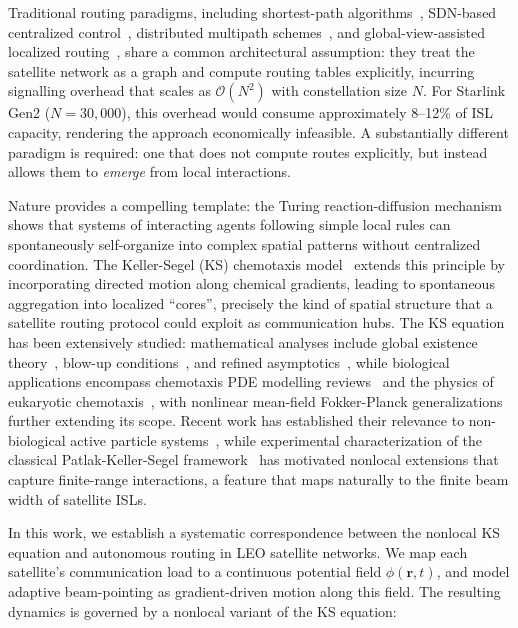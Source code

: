 \documentclass[sn-nature,pdflatex]{sn-jnl}
\begin{document}
Traditional routing paradigms, including shortest-path algorithms~\cite{chen_2024_jsac}, SDN-based centralized control~\cite{roth_2025_idlb,papa_2020}, distributed multipath schemes~\cite{li_2025_tmc}, and global-view-assisted localized routing~\cite{yan_2024_galor}, share a common architectural assumption: they treat the satellite network as a graph and compute routing tables explicitly, incurring signalling overhead that scales as $\mathcal{O}(N^2)$ with constellation size $N$.
For Starlink Gen2 ($N = 30,000$), this overhead would consume approximately 8--12\% of ISL capacity, rendering the approach economically infeasible.
A substantially different paradigm is required: one that does not compute routes explicitly, but instead allows them to \emph{emerge} from local interactions.

Nature provides a compelling template: the Turing reaction-diffusion mechanism~\cite{turing_1952} shows that systems of interacting agents following simple local rules can spontaneously self-organize into complex spatial patterns without centralized coordination.
The Keller-Segel (KS) chemotaxis model~\cite{keller_segel_1970,keller_segel_1971} extends this principle by incorporating directed motion along chemical gradients, leading to spontaneous aggregation into localized ``cores'', precisely the kind of spatial structure that a satellite routing protocol could exploit as communication hubs.
The KS equation has been extensively studied: mathematical analyses include global existence theory~\cite{horstmann_2003}, blow-up conditions~\cite{blanchet_2012}, and refined asymptotics~\cite{calvez_carrillo_2016}, while biological applications encompass chemotaxis PDE modelling reviews~\cite{hillen_painter_2009,painter_2019} and the physics of eukaryotic chemotaxis~\cite{levine_rappel_2013}, with nonlinear mean-field Fokker-Planck generalizations~\cite{chavanis_2008} further extending its scope. Recent work has established their relevance to non-biological active particle systems~\cite{carrillo_2020_ks_phase,bruna_2025_lane}, while experimental characterization of the classical Patlak-Keller-Segel framework~\cite{phan_2024_pnas} has motivated nonlocal extensions that capture finite-range interactions, a feature that maps naturally to the finite beam width of satellite ISLs.

In this work, we establish a systematic correspondence between the nonlocal KS equation and autonomous routing in LEO satellite networks.
We map each satellite's communication load to a continuous potential field $\phi(\mathbf{r},t)$, and model adaptive beam-pointing as gradient-driven motion along this field.
The resulting dynamics is governed by a nonlocal variant of the KS equation:
\end{document}

